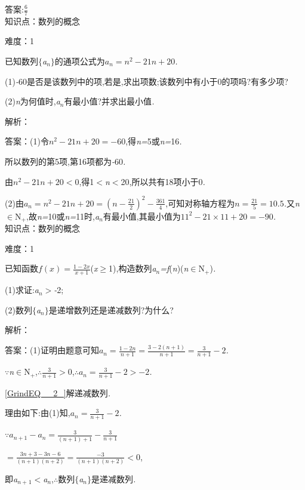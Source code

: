 \documentclass{article} %
\begin{document}
 答案:$\frac{6}{7}$ \\

知识点：数列的概念

难度：1

 已知数列$\mathrm{\{}$\textit{a${}_{n}$}$\mathrm{\}}$的通项公式为$a_n=n^2-21n+20$\textit{.}

 (1)\textit{-}60是否是该数列中的项,若是,求出项数;该数列中有小于0的项吗?有多少项?

 (2)\textit{n}为何值时,\textit{a${}_{n}$}有最小值?并求出最小值\textit{.}

解析：

 答案：(1)令$n^2-21n+20=-60$,得\textit{n=}5或\textit{n=}16\textit{.}

所以数列的第5项,第16项都为\textit{-}60\textit{.}

由$n^2-21n+20<0$,得1\textit{$<$n$<$}20,所以共有18项小于0\textit{.}

(2)由$a_n = n^2-21n+20=(n-\frac{21}{2})^2-\frac{361}{4}$,可知对称轴方程为$n=\frac{21}{5}=10.5$\textit{.}又\textit{n}$\mathrm{\in}$N\textit{${}_{+}$},故\textit{n=}10或\textit{n=}11时,\textit{a${}_{n}$}有最小值,其最小值为$11^2-21\times 11+20=-90$\textit{.} \\

知识点：数列的概念

难度：1

 已知函数$f(x) = \frac{1-2x}{x+1}$(\textit{x}$\mathrm{\ge}$1),构造数列\textit{a${}_{n}$=f}(\textit{n})(\textit{n}$\mathrm{\in}$N${}_{+}$)\textit{.}

 (1)求证:\textit{a${}_{n}$$>$-}2;

 (2)数列$\mathrm{\{}$\textit{a${}_{n}$}$\mathrm{\}}$是递增数列还是递减数列?为什么?

解析：

 答案：(1)证明由题意可知$a_n = \frac{1-2n}{n+1}=\frac{3-2(n+1)}{n+1}=\frac{3}{n+1}-2$\textit{.}

\textit{$\because$n}$\mathrm{\in}$N${}_{+}$,\textit{$\therefore$}$\frac{3}{n+1}>0$,$\therefore a_n = \frac{3}{n+1}-2 > -2$\textit{.}

 \eqref{GrindEQ__2_}解递减数列\textit{.}

理由如下:由(1)知,$a_n = \frac{3}{n+1}-2$\textit{.}

$\because a_{n+1}-a_n = \frac{3}{(n+1)+1}-\frac{3}{n+1}$

$=\frac{3n+3-3n-6}{(n+1)(n+2)} = \frac{-3}{(n+1)(n+2)}<0$,

即\textit{a${}_{n+}$}${}_{1}$\textit{$<$a${}_{n}$},\textit{$\therefore$}数列$\mathrm{\{}$\textit{a${}_{n}$}$\mathrm{\}}$是递减数列\textit{.} \\
\end{document}
